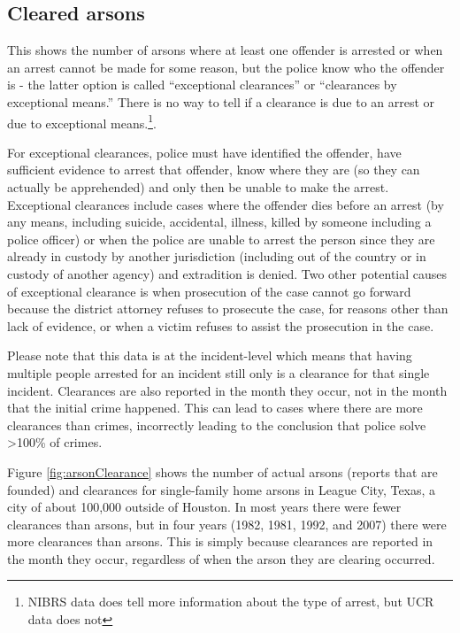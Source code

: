 \documentclass[
  12pt,
  openany]{book}
\begin{document}
\hypertarget{cleared-arsons}{%
\subsection{Cleared arsons}\label{cleared-arsons}}

This shows the number of arsons where at least one offender is arrested or when an arrest cannot be made for some reason, but the police know who the offender is - the latter option is called ``exceptional clearances'' or ``clearances by exceptional means.'' There is no way to tell if a clearance is due to an arrest or due to exceptional means.\footnote{NIBRS data does tell more information about the type of arrest, but UCR data does not}.

For exceptional clearances, police must have identified the offender, have sufficient evidence to arrest that offender, know where they are (so they can actually be apprehended) and only then be unable to make the arrest. Exceptional clearances include cases where the offender dies before an arrest (by any means, including suicide, accidental, illness, killed by someone including a police officer) or when the police are unable to arrest the person since they are already in custody by another jurisdiction (including out of the country or in custody of another agency) and extradition is denied. Two other potential causes of exceptional clearance is when prosecution of the case cannot go forward because the district attorney refuses to prosecute the case, for reasons other than lack of evidence, or when a victim refuses to assist the prosecution in the case.

Please note that this data is at the incident-level which means that having multiple people arrested for an incident still only is a clearance for that single incident. Clearances are also reported in the month they occur, not in the month that the initial crime happened. This can lead to cases where there are more clearances than crimes, incorrectly leading to the conclusion that police solve \textgreater100\% of crimes.

Figure \ref{fig:arsonClearance} shows the number of actual arsons (reports that are founded) and clearances for single-family home arsons in League City, Texas, a city of about 100,000 outside of Houston. In most years there were fewer clearances than arsons, but in four years (1982, 1981, 1992, and 2007) there were more clearances than arsons. This is simply because clearances are reported in the month they occur, regardless of when the arson they are clearing occurred.
\end{document}
